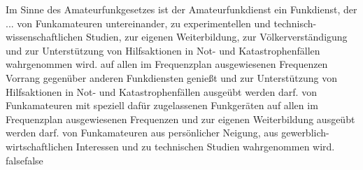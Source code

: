     {Im Sinne des Amateurfunkgesetzes ist der Amateurfunkdienst ein Funkdienst, der ...}
    {von Funkamateuren untereinander, zu experimentellen und technisch-wissenschaftlichen Studien, zur eigenen Weiterbildung, zur Völkerverständigung und zur Unterstützung von Hilfsaktionen in Not- und Katastrophenfällen wahrgenommen wird.}
    {auf allen im Frequenzplan ausgewiesenen Frequenzen Vorrang gegenüber anderen Funkdiensten genießt und zur Unterstützung von Hilfsaktionen in Not- und Katastrophenfällen ausgeübt werden darf.}
    {von Funkamateuren mit speziell dafür zugelassenen Funkgeräten auf allen im Frequenzplan ausgewiesenen Frequenzen und zur eigenen Weiterbildung ausgeübt werden darf.}
    {von Funkamateuren aus persönlicher Neigung, aus gewerblich-wirtschaftlichen Interessen und zu technischen Studien wahrgenommen wird.}
    {false}{false}